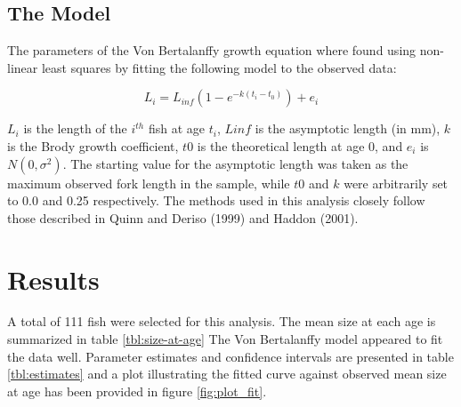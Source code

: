 \documentclass{article}
\begin{document}
\subsection*{The Model}
\label{sub:the_model}

The parameters of the Von Bertalanffy growth equation where found using
non-linear least squares by fitting the following model to the
observed data:

\begin{equation}
L_i = L_{inf} (1 - e^{-k(t_i-t_0)}) + e_i
\end{equation}

$L_i$ is the length of the $i^{th}$ fish at age $t_i$, $Linf$ is the
asymptotic length (in mm), $k$ is the Brody growth coefficient, $t0$
is the theoretical length at age 0, and $e_i$  is $N(0,\sigma ^2)$.
The starting value for the asymptotic length was taken as the maximum
observed fork length in the sample, while $t0$ and $k$ were arbitrarily
set to 0.0 and 0.25 respectively.  The methods used in this analysis
closely follow those described in Quinn and Deriso (1999) and Haddon
(2001).

\section*{Results}
\label{sec:results}

A total of 111 fish were selected for this analysis.
The mean size at each age is summarized in table \ref{tbl:size-at-age}
The Von Bertalanffy model appeared to fit the data well.  Parameter
estimates and confidence intervals are presented in table
\ref{tbl:estimates} and a plot illustrating the fitted curve against
observed mean size at age has been provided in figure \ref{fig:plot_fit}.
\end{document}
